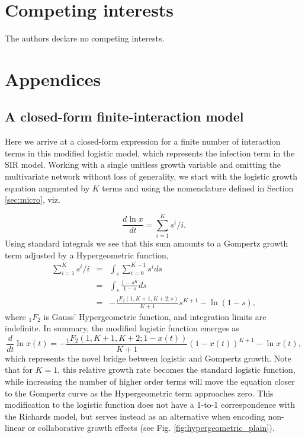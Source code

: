 \documentclass{article}
\begin{document}
\section*{Competing interests}
The authors declare no competing interests.

\appendix
\section*{Appendices}
\renewcommand{\thesubsection}{\Alph{subsection}}
\subsection{A closed-form finite-interaction model}
\label{appendix:a}
Here we arrive at a closed-form expression for a finite number of interaction terms in this modified logistic model, which represents the infection term in the SIR model. Working with a single unitless growth variable and omitting the multivariate network without loss of generality, we start with the logistic growth equation augmented by $K$ terms and using the nomenclature defined in Section \ref{sec:micro}, viz. 

\begin{equation}
\frac{d \ln{x}}{dt} = \sum_{i=1}^K s^i/i.
\end{equation}
Using standard integrals we see that this sum amounts to a Gompertz growth term adjusted by a Hypergeometric function,
\begin{eqnarray*}
  \sum_{i=1}^K s^i/i &=& \int_s \sum_{i=0}^{K-1} s^i ds\\
  &=&\int_s \frac{1-s^K}{1-s} ds\\
  &=&- \frac{{}_{1}F_{2}({1,K+1,K+2;s})}{K+1}s^{K+1} - \ln(1-s),
\end{eqnarray*}
where ${}_1F_{2}$ is Gauss' Hypergeometric function, and integration limits are indefinite. In summary, the modified logistic function emerges as
 \begin{equation}
 \label{eq:modLogistic2}
\frac{d}{dt}\ln{x(t)} = - \frac{{}_{1}F_{2}({1,K+1,K+2;1-x(t)})}{K+1}(1-x(t))^{K+1} - \ln{x(t)},
 \end{equation}
 which represents the novel bridge between logistic and Gompertz growth. Note that for $K=1$, this relative growth rate becomes the standard logistic function, while increasing the number of higher order terms will move the equation closer to the Gompertz curve as the Hypergeometric term approaches zero. This modification to the logistic function does not have a 1-to-1 correspondence with the Richards model, but serves instead as an alternative when encoding non-linear or collaborative growth effects (see Fig. \ref{fig:hypergeometric_plain}). 
\end{document}
